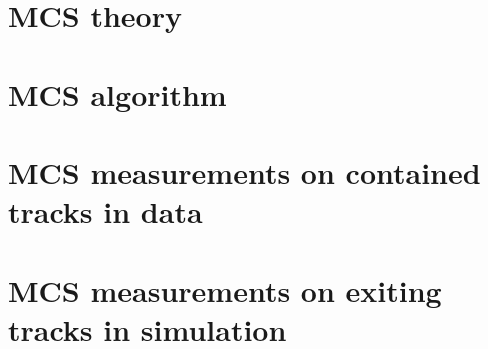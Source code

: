 \section{MCS theory}

\section{MCS algorithm}

\section{MCS measurements on contained tracks in data}

\section{MCS measurements on exiting tracks in simulation}
